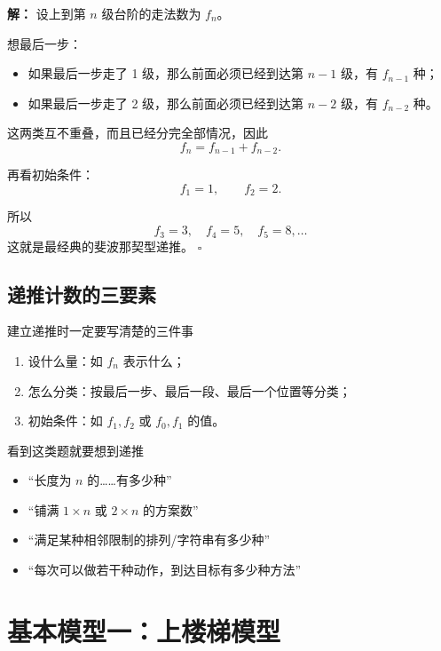 \documentclass[11pt,a4paper,fontset=fandol]{ctexart}
\theoremstyle{formaltheorem}
\theoremstyle{formalexample}
\newenvironment{solution}{\par\noindent\textbf{解：}}{\hfill$\square$\par}
\begin{document}
\begin{solution}
设上到第 $n$ 级台阶的走法数为 $f_n$。

想最后一步：
\begin{itemize}
  \item 如果最后一步走了 1 级，那么前面必须已经到达第 $n-1$ 级，有 $f_{n-1}$ 种；
  \item 如果最后一步走了 2 级，那么前面必须已经到达第 $n-2$ 级，有 $f_{n-2}$ 种。
\end{itemize}

这两类互不重叠，而且已经分完全部情况，因此
\[
  f_n=f_{n-1}+f_{n-2}.
\]

再看初始条件：
\[
  f_1=1,
  \qquad
  f_2=2.
\]

所以
\[
  f_3=3,
  \quad
  f_4=5,
  \quad
  f_5=8,
  \ldots
\]
这就是最经典的斐波那契型递推。
\end{solution}

\subsection{递推计数的三要素}

\begin{goalbox}{建立递推时一定要写清楚的三件事}
\begin{enumerate}
  \item 设什么量：如 $f_n$ 表示什么；
  \item 怎么分类：按最后一步、最后一段、最后一个位置等分类；
  \item 初始条件：如 $f_1,f_2$ 或 $f_0,f_1$ 的值。
\end{enumerate}
\end{goalbox}

\begin{skillbox}{看到这类题就要想到递推}
\begin{itemize}
  \item “长度为 $n$ 的……有多少种”
  \item “铺满 $1\times n$ 或 $2\times n$ 的方案数”
  \item “满足某种相邻限制的排列/字符串有多少种”
  \item “每次可以做若干种动作，到达目标有多少种方法”
\end{itemize}
\end{skillbox}

\section{基本模型一：上楼梯模型}
\end{document}
